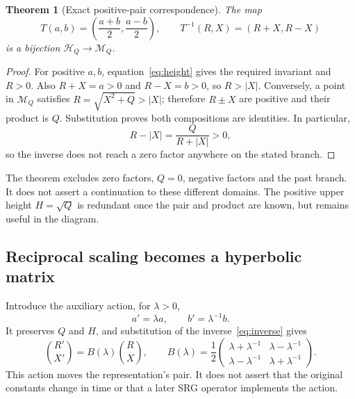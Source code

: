 \documentclass[11pt,a4paper]{article}
\newtheorem{theorem}{Theorem}[section]
\begin{document}
\begin{theorem}[Exact positive-pair correspondence]
The map
\begin{equation}
 T(a,b)=\left(\frac{a+b}{2},\frac{a-b}{2}\right),\qquad
 T^{-1}(R,X)=(R+X,R-X)
 \label{eq:inverse}
\end{equation}
is a bijection $\mathcal H_Q\to\mathcal M_Q$.
\end{theorem}
\begin{proof}
For positive $a,b$, equation~\eqref{eq:height} gives the required invariant and $R>0$. Also $R+X=a>0$ and $R-X=b>0$, so $R>|X|$. Conversely, a point in $\mathcal M_Q$ satisfies $R=\sqrt{X^2+Q}>|X|$; therefore $R\pm X$ are positive and their product is $Q$. Substitution proves both compositions are identities. In particular,
\[
 R-|X|=\frac{Q}{R+|X|}>0,
\]
so the inverse does not reach a zero factor anywhere on the stated branch.
\end{proof}
The theorem excludes zero factors, $Q=0$, negative factors and the past branch. It does not assert a continuation to these different domains. The positive upper height $H=\sqrt Q$ is redundant once the pair and product are known, but remains useful in the diagram.

\subsection{Reciprocal scaling becomes a hyperbolic matrix}
Introduce the auxiliary action, for $\lambda>0$,
\begin{equation}
 a'=\lambda a,\qquad b'=\lambda^{-1}b.
 \label{eq:reciprocal}
\end{equation}
It preserves $Q$ and $H$, and substitution of the inverse~\eqref{eq:inverse} gives
\begin{equation}
 \binom{R'}{X'}=B(\lambda)\binom RX,\qquad
 B(\lambda)=\frac12
 \begin{pmatrix}
 \lambda+\lambda^{-1}&\lambda-\lambda^{-1}\\
 \lambda-\lambda^{-1}&\lambda+\lambda^{-1}
 \end{pmatrix}.
 \label{eq:boost}
\end{equation}
This action moves the representation's pair. It does not assert that the original constants change in time or that a later SRG operator implements the action.
\end{document}
